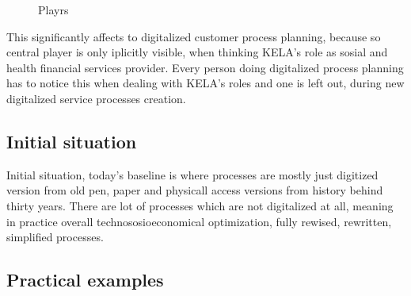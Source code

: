 \begin{figure}
 \begin{center}
  \caption{Playrs}
  \label{fig:players} 
 \end{center}
\end{figure}

This significantly affects to digitalized customer process planning,
because so central player is only iplicitly visible,
when thinking KE\-LA's role as sosial and health financial services provider.
Every person doing digitalized process planning has to notice this
when dealing with KE\-LA's roles and one is left out,
during new digitalized service processes creation.

\subsection{Initial situation}
\label{initial_situation}

Initial situation,
today's baseline is where processes are mostly just digitized version from old pen,
paper and physicall access versions from history behind thirty years.
There are lot of processes which are not digitalized at all,
meaning in practice overall technososioeconomical optimization,
fully rewised, rewritten, simplified processes.

\subsection{Practical examples}
\label{practical_examples}

